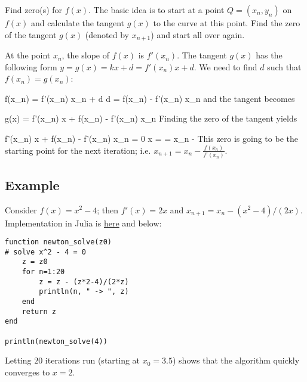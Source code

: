 
Find zero(s) for $f(x)$. The basic idea is to start at a point $Q = (x_n,y_n)$ on $f(x)$ and calculate the tangent $g(x)$ to the curve at this point. Find the zero of the tangent $g(x)$ (denoted by $x_{n+1}$) and start all over again.

 


At the point $x_n$, the slope of $f(x)$ is $f'(x_n)$. The tangent $g(x)$ has the following form $y = g(x) = k x + d = f'(x_n)x + d$. We need to find $d$ such that $f(x_n) = g(x_n)$:

\bee
f(x_n) = f'(x_n) x_n + d \rightarrow d = f(x_n) - f'(x_n) x_n
\eee
%
and the tangent becomes

\bee
g(x) = f'(x_n) x + f(x_n) - f'(x_n) x_n
\eee
%
Finding the zero of the tangent yields

\bee
f'(x_n) x + f(x_n) - f'(x_n) x_n = 0 \rightarrow x =  = x_n - 
\eee
%
This zero is going to be the starting point for the next iteration; i.e. $x_{n+1} = x_n - \frac{f(x_n)}{f'(x_n)}$.

\subsection{Example}

Consider $f(x) = x^2-4$; then $f'(x) = 2x$ and $x_{n+1} = x_n - (x^2-4)/(2x)$. Implementation in Julia is \href{file:///home/cnovak/src/julia/JuliaStuff/newton.jl}{here} and below:

\begin{verbatim}
function newton_solve(z0)
# solve x^2 - 4 = 0
    z = z0
    for n=1:20
        z = z - (z*2-4)/(2*z)
        println(n, " -> ", z)
    end
    return z
end

println(newton_solve(4))
\end{verbatim}
%
Letting $20$ iterations run (starting at $x_0=3.5$) shows that the algorithm quickly converges to $x=2$.

